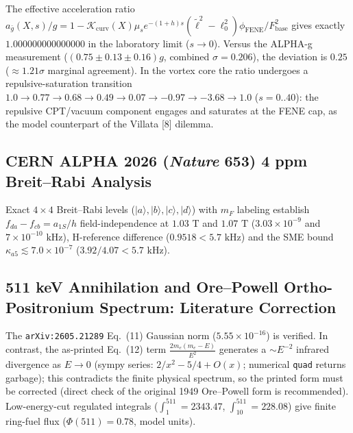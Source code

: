 \documentclass[12pt,a4paper]{article}
\begin{document}
The effective acceleration ratio $a_{\bar{g}}(X,s)/g = 1 - \mathcal{K}_{\mathrm{curv}}(X) \mu_s e^{-(1+h)s} (\tilde{\ell}^2-\ell_0^2)\phi_{\mathrm{FENE}}/F_{\mathrm{base}}^2$ gives exactly $1.000000000000000$ in the laboratory limit ($s \to 0$). Versus the ALPHA-g measurement ($(0.75 \pm 0.13 \pm 0.16)g$, combined $\sigma = 0.206$), the deviation is $0.25$ ($\approx 1.21\sigma$ marginal agreement). In the vortex core the ratio undergoes a repulsive-saturation transition $1.0 \to 0.77 \to 0.68 \to 0.49 \to 0.07 \to -0.97 \to -3.68 \to 1.0$ ($s = 0..40$): the repulsive CPT/vacuum component engages and saturates at the FENE cap, as the model counterpart of the Villata [8] dilemma.

\subsection{CERN ALPHA 2026 (\textit{Nature} 653) 4 ppm Breit--Rabi Analysis}

Exact $4\times 4$ Breit--Rabi levels ($|a\rangle,|b\rangle,|c\rangle,|d\rangle$) with $m_F$ labeling establish $f_{da}-f_{cb} = a_{1S}/h$ field-independence at $1.03\text{ T}$ and $1.07\text{ T}$ ($3.03 \times 10^{-9}$ and $7 \times 10^{-10}\text{ kHz}$), H-reference difference ($0.9518 < 5.7\text{ kHz}$) and the SME bound $\kappa_{a5} \lesssim 7.0 \times 10^{-7}$ ($3.92/4.07 < 5.7\text{ kHz}$).

\subsection{511 keV Annihilation and Ore--Powell Ortho-Positronium Spectrum: Literature Correction}

The \texttt{arXiv:2605.21289} Eq.\ (11) Gaussian norm ($5.55 \times 10^{-16}$) is verified. In contrast, the as-printed Eq.\ (12) term $\frac{2m_e(m_e-E)}{E^2}$ generates a $\sim E^{-2}$ infrared divergence as $E \to 0$ (sympy series: $2/x^2 - 5/4 + O(x)$; numerical \texttt{quad} returns garbage); this contradicts the finite physical spectrum, so the printed form must be corrected (direct check of the original 1949 Ore--Powell form is recommended). Low-energy-cut regulated integrals ($\int_1^{511} = 2343.47$, $\int_{10}^{511} = 228.08$) give finite ring-fuel flux ($\Phi(511) = 0.78$, model units).
\end{document}

